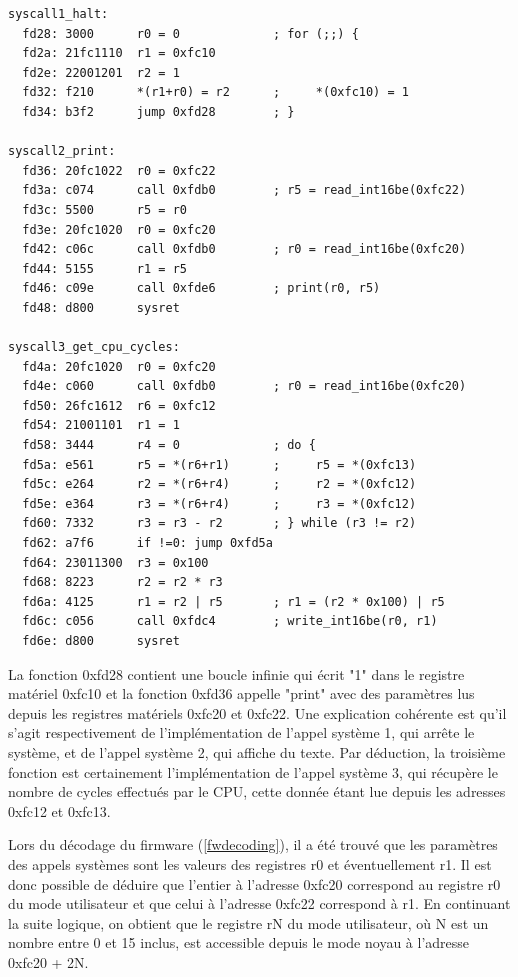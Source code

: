 \documentclass[a4paper,10pt]{article}
\begin{document}
\begin{verbatim}
syscall1_halt:
  fd28: 3000      r0 = 0             ; for (;;) {
  fd2a: 21fc1110  r1 = 0xfc10
  fd2e: 22001201  r2 = 1
  fd32: f210      *(r1+r0) = r2      ;     *(0xfc10) = 1
  fd34: b3f2      jump 0xfd28        ; }

syscall2_print:
  fd36: 20fc1022  r0 = 0xfc22
  fd3a: c074      call 0xfdb0        ; r5 = read_int16be(0xfc22)
  fd3c: 5500      r5 = r0
  fd3e: 20fc1020  r0 = 0xfc20
  fd42: c06c      call 0xfdb0        ; r0 = read_int16be(0xfc20)
  fd44: 5155      r1 = r5
  fd46: c09e      call 0xfde6        ; print(r0, r5)
  fd48: d800      sysret

syscall3_get_cpu_cycles:
  fd4a: 20fc1020  r0 = 0xfc20
  fd4e: c060      call 0xfdb0        ; r0 = read_int16be(0xfc20)
  fd50: 26fc1612  r6 = 0xfc12
  fd54: 21001101  r1 = 1
  fd58: 3444      r4 = 0             ; do {
  fd5a: e561      r5 = *(r6+r1)      ;     r5 = *(0xfc13)
  fd5c: e264      r2 = *(r6+r4)      ;     r2 = *(0xfc12)
  fd5e: e364      r3 = *(r6+r4)      ;     r3 = *(0xfc12)
  fd60: 7332      r3 = r3 - r2       ; } while (r3 != r2)
  fd62: a7f6      if !=0: jump 0xfd5a
  fd64: 23011300  r3 = 0x100
  fd68: 8223      r2 = r2 * r3
  fd6a: 4125      r1 = r2 | r5       ; r1 = (r2 * 0x100) | r5
  fd6c: c056      call 0xfdc4        ; write_int16be(r0, r1)
  fd6e: d800      sysret
\end{verbatim}

La fonction 0xfd28 contient une boucle infinie qui écrit "1" dans le registre matériel 0xfc10 et la fonction 0xfd36 appelle "print" avec des paramètres lus depuis les registres matériels 0xfc20 et 0xfc22. Une explication cohérente est qu'il s'agit respectivement de l'implémentation de l'appel système 1, qui arrête le système, et de l'appel système 2, qui affiche du texte. Par déduction, la troisième fonction est certainement l'implémentation de l'appel système 3, qui récupère le nombre de cycles effectués par le CPU, cette donnée étant lue depuis les adresses 0xfc12 et 0xfc13.

Lors du décodage du firmware (\ref{fwdecoding}), il a été trouvé que les paramètres des appels systèmes sont les valeurs des registres r0 et éventuellement r1. Il est donc possible de déduire que l'entier à l'adresse 0xfc20 correspond au registre r0 du mode utilisateur et que celui à l'adresse 0xfc22 correspond à r1. En continuant la suite logique, on obtient que le registre rN du mode utilisateur, où N est un nombre entre 0 et 15 inclus, est accessible depuis le mode noyau à l'adresse 0xfc20 + 2N.
\end{document}
